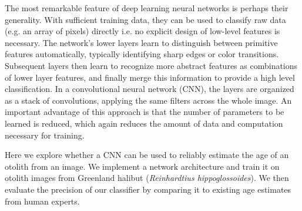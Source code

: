 \documentclass[10pt,letterpaper]{article}
\begin{document}
The most remarkable feature of deep learning neural networks is perhaps their generality.  With sufficient training data, they can be used to classify raw data (e.g. an array of pixels) directly i.e. no explicit design of low-level features is necessary. The network's lower layers learn to distinguish between primitive features automatically, typically identifying sharp edges or color transitions.  Subsequent layers then learn to recognize more abstract features as combinations of lower layer features, and finally merge this information to provide a high level classification. In a convolutional neural network (CNN), the layers are organized as a stack of convolutions, applying the same filters across the whole image.  An important advantage of this approach is that the number of parameters to be learned is reduced, which again reduces the amount of data and computation necessary for training.


Here we explore whether a CNN can be used to reliably estimate the age of an otolith from an image. We implement a network architecture and train it on otolith images from Greenland halibut (\emph{Reinhardtius hippoglossoides}). We then evaluate the precision of our classifier by comparing it to existing age estimates from human experts.
\end{document}
